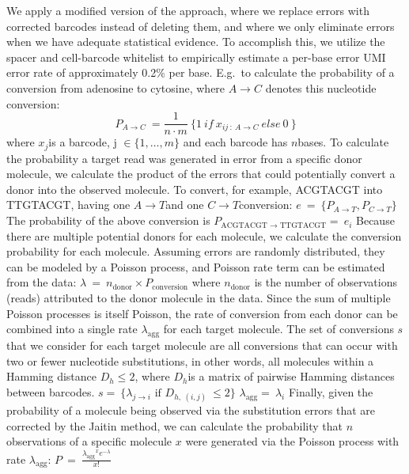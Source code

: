 We apply a modified version of the \citep{Jaitin2014} approach, where we replace errors with corrected barcodes instead of deleting them, and where we only eliminate errors when we have adequate statistical evidence. 
To accomplish this, we utilize the spacer and cell-barcode whitelist to empirically estimate a per-base error UMI error rate of approximately 0.2\% per base. 
E.g.\ to calculate the probability of a conversion from adenosine to cytosine, where \(A \rightarrow C\) denotes this nucleotide conversion:
\[P_{A \rightarrow C}\  = \frac{1}{n \cdot m}\ \{ 1\ if\ x_{ij\ :\ A \rightarrow C}\ else\ 0\ \}\]
where \(x_{j}\)is a barcode, \(\text{j\ } \in \{ 1,\ldots,m\}\) and each barcode has \(n\)bases.
To calculate the probability a target read was generated in error from a specific donor molecule, we calculate the product of the errors that could potentially convert a donor into the observed molecule. 
To convert, for example, ACGTACGT into TTGTACGT, having one \(A \rightarrow T\)and one \(C \rightarrow T\)conversion:
\(e\  = \ \{ P_{A \rightarrow T},P_{C \rightarrow T}\}\ \)
The probability of the above conversion is
\(P_{\text{ACGTACGT\ } \rightarrow \text{\ TTGTACGT}} = \ e_{i}\)
Because there are multiple potential donors for each molecule, we calculate the conversion probability for each molecule. 
Assuming errors are randomly distributed, they can be modeled by a Poisson process, and Poisson rate term can be estimated from the data:
\(\lambda\  = \ n_{\text{donor}} \times P_{\text{conversion}}\)
where \(n_{\text{donor}}\) is the number of observations (reads) attributed to the donor molecule in the data. 
Since the sum of multiple Poisson processes is itself Poisson, the rate of conversion from each donor can be combined into a single rate \(\lambda_{\text{agg}}\) for each target molecule. 
The set of conversions \(s\) that we consider for each target molecule are all conversions that can occur with two or fewer nucleotide substitutions, in other words, all molecules within a Hamming distance \(D_{h} \leq 2\), where \(D_{h}\)is a matrix of pairwise Hamming distances between barcodes.
\(s = \ \{\lambda_{j \rightarrow i}\text{\ if\ }D_{h,\ (i,j)}\  \leq 2\}\)
\(\lambda_{\text{agg}} = \ \lambda_{i}\)
Finally, given the probability of a molecule being observed via the substitution errors that are corrected by the Jaitin method, we can calculate the probability that \(n\)observations of a specific molecule \(x\) were generated via the Poisson process with rate \(\lambda_{\text{agg}}\):
\(P\  = \ \frac{{\lambda_{\text{agg}}}^{x}e^{- \lambda}}{x!}\)

